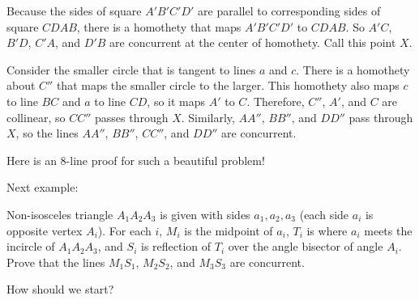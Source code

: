 Because the sides of square $A'B'C'D'$ are parallel to corresponding sides of square $CDAB$, there is a homothety that maps $A'B'C'D'$ to $CDAB$. So $A'C$, $B'D$, $C'A$, and $D'B$ are concurrent at the center of homothety. Call this point $X$.

Consider the smaller circle that is tangent to lines $a$ and $c$. There is a homothety about $C''$ that maps the smaller circle to the larger. This homothety also maps $c$ to line $BC$ and $a$ to line $CD$, so it maps $A'$ to $C$. Therefore, $C''$, $A'$, and $C$ are collinear, so $CC''$ passes through $X$. Similarly, $AA''$, $BB''$, and $DD''$ pass through $X$, so the lines $AA''$, $BB''$, $CC''$, and $DD''$ are concurrent.

Here is an 8-line proof for such a beautiful problem! 

% 


Next example:

Non-isosceles triangle $A_1A_2A_3$ is given with sides $a_1, a_2, a_3$ (each side $a_i$ is opposite vertex $A_i$). For each $i$, $M_i$ is the midpoint of $a_i$, $T_i$ is where $a_i$ meets the incircle of $A_1A_2A_3$, and $S_i$ is reflection of $T_i$ over the angle bisector of angle $A_i$. Prove that the lines $M_1S_1$, $M_2S_2$, and $M_3S_3$ are concurrent.

How should we start?









